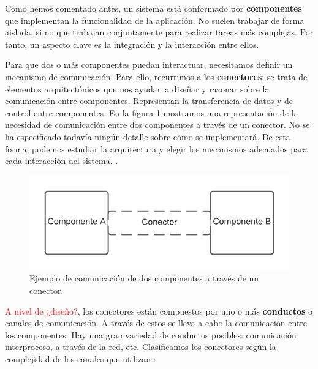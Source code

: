 Como hemos comentado antes, un sistema está conformado por \textbf{componentes} que implementan la funcionalidad de la aplicación. No suelen trabajar de forma aislada, si no que trabajan conjuntamente para realizar tareas más complejas. Por tanto, un aspecto clave es la integración y la interacción entre ellos. \cite{mehtaTaxonomySoftwareConnectors2000}

Para que dos o más componentes puedan interactuar, necesitamos definir un mecanismo de comunicación. Para ello, recurrimos a los \textbf{conectores}: se trata de elementos arquitectónicos que nos ayudan a diseñar y razonar sobre la comunicación entre componentes. Representan la transferencia de datos y de control entre componentes. En la figura \ref{fig:componentesEjemplo} mostramos una representación de la necesidad de comunicación entre dos componentes a través de un conector. No se ha especificado todavía ningún detalle sobre cómo se implementará. De esta forma, podemos estudiar la arquitectura y elegir los mecanismos adecuados para cada interacción del sistema. \cite{taylorSoftwareArchitectureFoundations2009}.


\begin{figure}[h!]
  \centering
  \includegraphics[scale=0.78]{02_arquitectura/images/conector}
  \caption{Ejemplo de comunicación de dos componentes a través de un conector.}
  \label{fig:componentesEjemplo}
\end{figure}

\textcolor{red}{A nivel de ¿diseño?}, los conectores están compuestos por uno o más \textbf{conductos} o canales de comunicación. A través de estos se lleva a cabo la comunicación entre los componentes. Hay una gran variedad de conductos posibles: comunicación interproceso, a través de la red, etc. Clasificamos los conectores según la complejidad de los canales que utilizan \cite{mehtaTaxonomySoftwareConnectors2000}:

